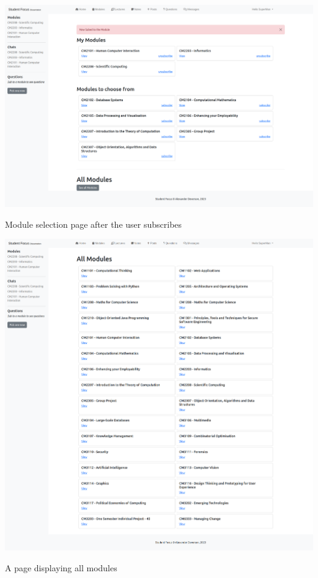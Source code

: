 \includegraphics[scale=0.20]{images/application/6 - module_selection_subed.png}

Module selection page after the user subscribes

\includegraphics[scale=0.20]{images/application/7 - all_modules.png}

A page displaying all modules

